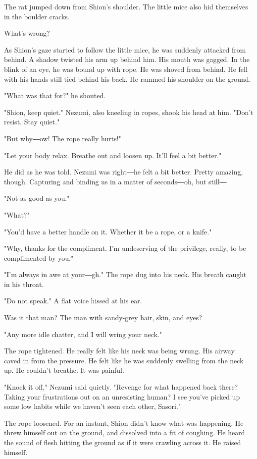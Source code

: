 The rat jumped down from Shion's shoulder. The little mice also hid
themselves in the boulder cracks.

What's wrong?

As Shion's gaze started to follow the little mice, he was suddenly
attacked from behind. A shadow twisted his arm up behind him. His mouth
was gagged. In the blink of an eye, he was bound up with rope. He was
shoved from behind. He fell with his hands still tied behind his back.
He rammed his shoulder on the ground.

"What was that for?" he shouted.

"Shion, keep quiet." Nezumi, also kneeling in ropes, shook his head at
him. "Don't resist. Stay quiet."

"But why―ow! The rope really hurts!"

"Let your body relax. Breathe out and loosen up. It'll feel a bit
better."

He did as he was told. Nezumi was right―he felt a bit better. Pretty
amazing, though. Capturing and binding us in a matter of seconds―oh, but
still―

"Not as good as you."

"What?"

"You'd have a better handle on it. Whether it be a rope, or a knife."

"Why, thanks for the compliment. I'm undeserving of the privilege,
really, to be complimented by you."

"I'm always in awe at your―gh." The rope dug into his neck. His breath
caught in his throat.

"Do not speak." A flat voice hissed at his ear.

Was it that man? The man with sandy-grey hair, skin, and eyes?

"Any more idle chatter, and I will wring your neck."

The rope tightened. He really felt like his neck was being wrung. His
airway caved in from the pressure. He felt like he was suddenly swelling
from the neck up. He couldn't breathe. It was painful.

"Knock it off," Nezumi said quietly. "Revenge for what happened back
there? Taking your frustrations out on an unresisting human? I see
you've picked up some low habits while we haven't seen each other,
Sasori."

The rope loosened. For an instant, Shion didn't know what was happening.
He threw himself out on the ground, and dissolved into a fit of
coughing. He heard the sound of flesh hitting the ground as if it were
crawling across it. He raised himself.

